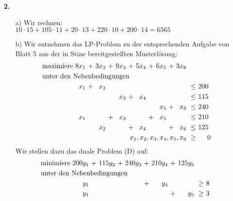 \documentclass [a4paper,11pt]{article}
\begin{document}
\begin{enumerate}
        \item[\textbf{2.}]
            \begin{enumerate}
                \item[a)]
                    Wir rechnen:\\
                    $ 10 \cdot 15 + 105 \cdot 11 + 20 \cdot 13 + 220 \cdot 10 + 200 \cdot 14 = 6565 $
                \item[b)]
                    Wir entnehmen das LP-Problem zu der entsprechenden Aufgabe von Blatt 5 aus der in Stine bereitgestellten Musterlösung:\\
                    \begin{align*}
                    \begin{alignedat}{10}
                    & \text{maximiere } & 8x_1 &\ + &\ 3x_2 &\ + &\ 9x_3 &\ + &\ 5x_4 &\ + &\ 6x_5 &\ + &\ 3x_6 & & \\
                    & \rlap{unter den Nebenbedingungen} & & & & & & & & & & & & & \\
                    && x_1 &\ + &\ x_2 & & & & & & & & &\ \leq &\ 200\ \\
                    &&     &    &      & & x_3 &\ + &\ x_4 & & & & &\ \leq &\ 115\ \\
                    &&     &    &      & &     &    &      & &\ x_5 &\ + &\ x_6 &\ \leq &\ 240\ \\
                    && x_1 &    &      &\ + &\ x_3 & & &\ + &\ x_5 & & &\ \leq &\ 210\ \\
                    &&     &    &\ x_2 &    &      &\ + &\ x_4 & & &\ + &\ x_6 &\ \leq &\ 125\ \\
                    && & & & & & & & & & & \llap{$x_1,x_2,x_3,x_4,x_5,x_6$} &\ \geq &\ 0
                    \end{alignedat}
                    \end{align*}
                    Wir stellen dazu das duale Problem (D) auf:
                    \begin{align*}
                    \begin{alignedat}{10}
                    & \text{minimiere } & 200y_1 &\ + &\ 115y_2 &\ + &\ 240y_3 &\ + &\ 210y_4 &\ + &\ 125y_5 & & \\
                    & \rlap{unter den Nebenbedingungen} & & & & & & & & & & &  \\
                    && y_1 & & & & &\ + &\ y_4 & & &\ \geq &\ 8\ \\
                    && y_1 & & & & & & &\ + &\ y_5 &\ \geq &\ 3\ \\

\end{alignedat}
\end{align*}
\end{enumerate}
\end{enumerate}
\end{document}
